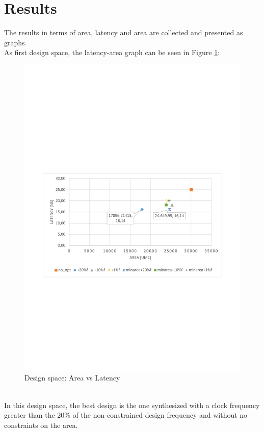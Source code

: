 \section{Results}
The results in terms of area, latency and area are collected and presented as graphs.\\
As first design space, the latency-area graph can be seen in Figure \ref{fig:lat_area}:
\begin{figure}[!htbp]
\centering
\captionsetup{justification=centering}
\includegraphics[scale=0.5,angle=0]{./chapters/files/latency_area.pdf}
\caption{Design space: Area \protect\footnotemark[1] vs Latency}
\label{fig:lat_area}
\end{figure}\\
In this design space, the best design is the one synthesized with a clock frequency greater than the 20\% of the non-constrained design frequency and without no constraints on the area.\\

